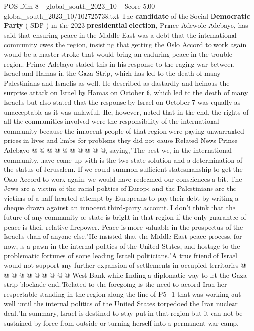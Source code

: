 \begin{textsample}{POS Dim 8 – global\_south\_2023\_10 – Score 5.00 – global\_south\_2023\_10/102725738.txt}  \label{ex:f8_pos_363}
The \textbf{candidate} of the Social \textbf{Democratic} \textbf{Party} ( SDP ) in the 2023 \textbf{presidential} \textbf{election}, Prince Adewole Adebayo, has said that ensuring peace in the Middle East was a debt that the international community owes the region, insisting that getting the Oslo Accord to work again would be a master stroke that would bring an enduring peace in the trouble region.
Prince Adebayo stated this in his response to the raging war between Israel and Hamas in the Gaza Strip, which has led to the death of many Palestinians and Israelis as well.
He described as dastardly and heinous the surprise attack on Israel by Hamas on October 6, which led to the death of many Israelis but also stated that the response by Israel on October 7 was equally as unacceptable as it was unlawful.
He, however, noted that in the end, the rights of all the communities involved were the responsibility of the international community because the innocent people of that region were paying unwarranted prices in lives and limbs for problems they did not cause Related News Prince Adebayo @ @ @ @ @ @ @ @ @ @, saying,"The best we, in the international community, have come up with is the two-state solution and a determination of the status of Jerusalem.
If we could summon sufficient statesmanship to get the Oslo Accord to work again, we would have redeemed our consciences a bit.
The Jews are a victim of the racial politics of Europe and the Palestinians are the victims of a half-hearted attempt by Europeans to pay their debt by writing a cheque drawn against an innocent third-party account.
I don't think that the future of any community or state is bright in that region if the only guarantee of peace is their relative firepower.
Peace is more valuable in the prospectus of the Israelis than of anyone else."He insisted that the Middle East peace process, for now, is a pawn in the internal politics of the United States, and hostage to the problematic fortunes of some leading Israeli politicians."A true friend of Israel would not support any further expansion of settlements in occupied territories @ @ @ @ @ @ @ @ @ @ West Bank while finding a diplomatic way to let the Gaza strip blockade end."Related to the foregoing is the need to accord Iran her respectable standing in the region along the line of P5+1 that was working out well until the internal politics of the United States torpedoed the Iran nuclear deal."In summary, Israel is destined to stay put in that region but it can not be sustained by force from outside or turning herself into a permanent war camp.

\end{textsample}
